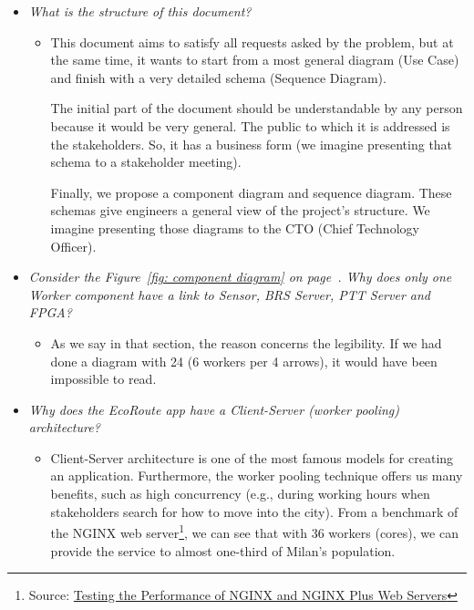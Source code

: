 \documentclass[a4paper]{article}
\begin{document}
    \begin{itemize}[label=]
        \item \emph{What is the structure of this document?}
        \begin{itemize}[label=]
            \item This document aims to satisfy all requests asked by the problem, but at the same time, it wants to start from a most general diagram (Use Case) and finish with a very detailed schema (Sequence Diagram). 

            The initial part of the document should be understandable by any person because it would be very general. The public to which it is addressed is the stakeholders. So, it has a business form (we imagine presenting that schema to a stakeholder meeting).
            
            Finally, we propose a component diagram and sequence diagram. These schemas give engineers a general view of the project's structure. We imagine presenting those diagrams to the CTO (Chief Technology Officer).
        \end{itemize}
        
        \item \emph{Consider the Figure~\ref{fig: component diagram} on page~\pageref{fig: component diagram}. Why does only one Worker component have a link to Sensor, BRS Server, PTT Server and FPGA?}
        \begin{itemize}[label=]
            \item As we say in that section, the reason concerns the legibility. If we had done a diagram with 24 (6 workers per 4 arrows), it would have been impossible to read.
        \end{itemize}

        \item \emph{Why does the EcoRoute app have a Client-Server (worker pooling) architecture?}
        \begin{itemize}[label=]
            \item Client-Server architecture is one of the most famous models for creating an application. Furthermore, the worker pooling technique offers us many benefits, such as high concurrency (e.g., during working hours when stakeholders search for how to move into the city). From a benchmark of the NGINX web server\footnote{Source: \href{https://www.nginx.com/blog/testing-the-performance-of-nginx-and-nginx-plus-web-servers/}{Testing the Performance of NGINX and NGINX Plus Web Servers}}, we can see that with 36 workers (cores), we can provide the service to almost one-third of Milan's population.
        \end{itemize}


\end{itemize}
\end{document}
